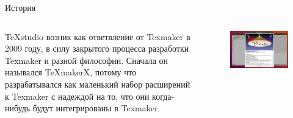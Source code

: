 \documentclass[11pt]{beamer}
\begin{document}
	\begin{frame}{История}
		\begin{columns}[c,onlytextwidth]
			\begin{column}{0.44\textwidth}
				TeXstudio возник как ответвление от Texmaker в 2009 году, в силу закрытого процесса разработки Texmaker и разной философии. Сначала он назывался TeXmakerX, потому что разрабатывался как маленький набор расширений к Texmaker с надеждой на то, что они когда-нибудь будут интегрированы в Texmaker.
			\end{column}
			\begin{column}{0.50\textwidth}
				\begin{figure}
					\includegraphics[width=\textwidth]{res/texstudio21212.jpg}
				\end{figure}
			\end{column}
		\end{columns}
	\end{frame}
\end{document}
